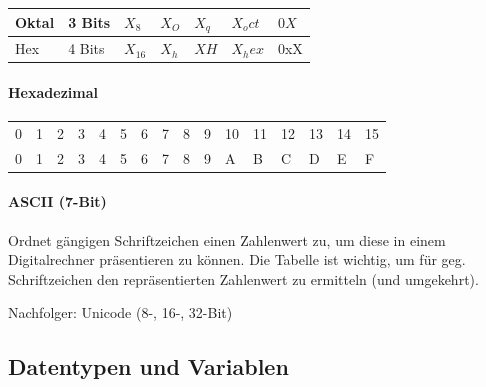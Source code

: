 		\begin{tabular}{|l|llllll|}
			\hline
			Oktal & 3 Bits & $X_8$ & $X_O$ & $X_q$ & $X_oct$ & $0X$ \\
			\hline
			Hex & 4 Bits   & $X_16$ & $X_h$ & $XH$ & $X_hex$ & 0xX \\
			\hline
		\end{tabular}

		\paragraph{Hexadezimal}
			\begin{tabular}{llllllllllllllll}
				0 & 1 & 2 & 3 & 4 & 5 & 6 & 7 & 8 & 9 & 10 & 11 & 12 & 13 & 14 & 15 \\
				0 & 1 & 2 & 3 & 4 & 5 & 6 & 7 & 8 & 9 & A & B & C & D & E & F \\
			\end{tabular}
			
		\paragraph{ASCII (7-Bit)}
			
			Ordnet gängigen Schriftzeichen einen Zahlenwert zu, um diese in einem Digitalrechner präsentieren zu können.
			Die Tabelle ist wichtig, um für geg. Schriftzeichen den repräsentierten Zahlenwert zu ermitteln (und umgekehrt).

			Nachfolger: Unicode (8-, 16-, 32-Bit)
	
	\subsection{Datentypen und Variablen}
